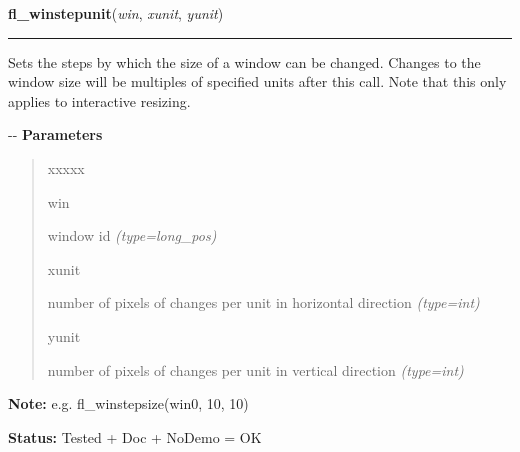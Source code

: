 \hspace{.8\funcindent}\begin{boxedminipage}{\funcwidth}

    \raggedright \textbf{fl\_winstepunit}(\textit{win}, \textit{xunit}, \textit{yunit})

    \vspace{-1.5ex}

    \rule{\textwidth}{0.5\fboxrule}
\setlength{\parskip}{2ex}

Sets the steps by which the size of a window can be changed. Changes
to the window size will be multiples of specified units after this
call. Note that this only applies to interactive resizing.

-{}-
\setlength{\parskip}{1ex}
      \textbf{Parameters}
      \vspace{-1ex}

      \begin{quote}
        \begin{Ventry}{xxxxx}

          \item[win]


window id
            {\it (type=long\_pos)}

          \item[xunit]


number of pixels of changes per unit in horizontal direction
            {\it (type=int)}

          \item[yunit]


number of pixels of changes per unit in vertical direction
            {\it (type=int)}

        \end{Ventry}

      \end{quote}

\textbf{Note:} 
e.g. fl\_winstepsize(win0, 10, 10)


\textbf{Status:} 
Tested + Doc + NoDemo = OK


    \end{boxedminipage}

    \label{xformslib:flxbasic:fl_winstepsize}

    \vspace{0.5ex}

